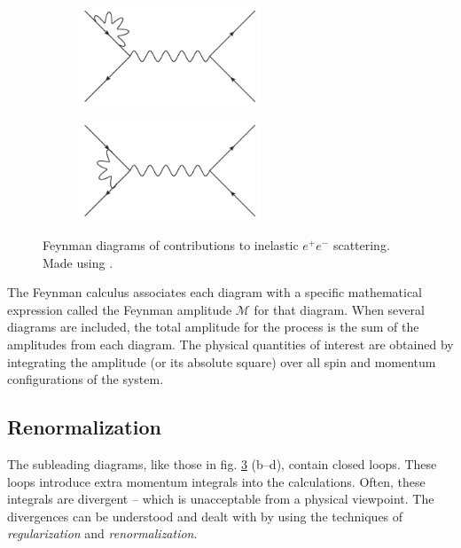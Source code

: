 \documentclass[twoside,english]{uiofysmaster}
\begin{document}
\begin{figure}[htbp]
	\begin{subfigure}[b]{0.45\textwidth}
		\centering
		\includegraphics[width=0.6\textwidth]{figures/susyintro/epscattering_fermioncorr.pdf}
		\caption{ }
		\label{fig:feynmandiagram_c}
	\end{subfigure}
	\begin{subfigure}[b]{0.45\textwidth}
		\centering
		\includegraphics[width=0.6\textwidth]{figures/susyintro/epscattering_vertexcorr.pdf}
		\caption{ }
		\label{fig:feynmandiagram_d}
	\end{subfigure}
	\caption{Feynman diagrams of contributions to inelastic $e^+ e^-$ scattering. Made using \cite{Binosi:2003yf}.}
	\label{fig:feynmandiagram}
\end{figure}
The Feynman calculus associates each diagram with a specific mathematical expression called the Feynman amplitude $\mathcal{M}$ for that diagram. When several diagrams are included, the total amplitude for the process is the sum of the amplitudes from each diagram. The physical quantities of interest are obtained by integrating the amplitude (or its absolute square) over all spin and momentum configurations of the system.

\subsection{Renormalization}
The subleading diagrams, like those in fig.  \ref{fig:feynmandiagram} (b--d), contain closed loops. These loops introduce extra momentum integrals into the calculations. Often, these integrals are divergent -- which is unacceptable from a physical viewpoint. The divergences can be understood and dealt with by using the techniques of {\it regularization} and {\it renormalization}. 
\end{document}
